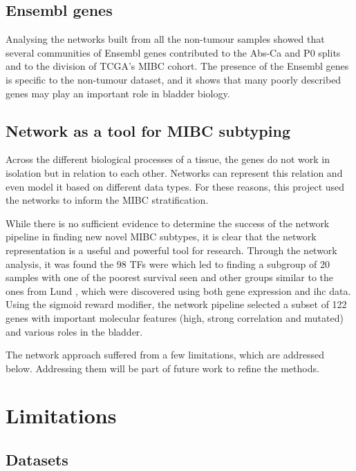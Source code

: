 \subsection*{Ensembl genes}

Analysing the networks built from all the non-tumour samples showed that several communities of Ensembl genes contributed to the Abs-Ca and P0 splits and to the division of TCGA's MIBC cohort. The presence of the Ensembl genes is specific to the non-tumour dataset, and it shows that many poorly described genes may play an important role in bladder biology.

\subsection*{Network as a tool for MIBC subtyping}

Across the different biological processes of a tissue, the genes do not work in isolation but in relation to each other. Networks can represent this relation and even model it based on different data types. For these reasons, this project used the networks to inform the MIBC stratification. 

While there is no sufficient evidence to determine the success of the network pipeline in finding new novel MIBC subtypes, it is clear that the network representation is a useful and powerful tool for research. Through the network analysis, it was found the 98 TFs were which led to finding a subgroup of 20 samples with one of the poorest survival seen and other groups similar to the ones from Lund \citep{Marzouka2018-ge}, which were discovered using both gene expression and \acrshort{ihc} data. Using the sigmoid reward modifier, the network pipeline selected a subset of 122 genes with important molecular features (high, strong correlation and mutated) and various roles in the bladder.

The network approach suffered from a few limitations, which are addressed below. Addressing them will be part of future work to refine the methods.


\section{Limitations} \label{s:limitations}

\subsection*{Datasets}


